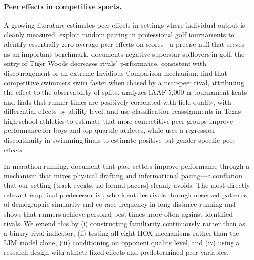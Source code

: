\documentclass[12pt]{article}
\theoremstyle{definition}
\theoremstyle{remark}
\begin{document}
\paragraph{Peer effects in competitive sports.}
A growing literature estimates peer effects in settings where individual output
is cleanly measured.
\citet{GuryanKroftNotowidigdo2009} exploit random pairing in professional golf
tournaments to identify essentially zero average peer effects on scores---a
precise null that serves as an important benchmark.
\citet{Brown2011} documents negative superstar spillovers in golf: the entry of
Tiger Woods decreases rivals' performance, consistent with discouragement or an
extreme Invidious Comparison mechanism.
\citet{YamaneHayashi2015} find that competitive swimmers swim faster when chased
by a near-peer rival, attributing the effect to the observability of splits.
\citet{Hill2014} analyzes IAAF 5{,}000 m tournament heats and finds that runner
times are positively correlated with field quality, with differential effects
by ability level.
\citet{Ashby2025} and \citet{AshbyRamos2023} use classification reassignments
in Texas high-school athletics to estimate that more competitive peer groups
improve performance for boys and top-quartile athletes, while \citet{Jiang2020}
uses a regression discontinuity in swimming finals to estimate positive but
gender-specific peer effects.

In marathon running, \citet{EmersonHill2018} document that pace setters
improve performance through a mechanism that mixes physical drafting and
informational pacing---a conflation that our setting (track events, no formal
pacers) cleanly avoids.
The most directly relevant empirical predecessor is \citet{Kilduff2014},
who identifies rivals through observed patterns of demographic similarity and
co-race frequency in long-distance running and shows that runners achieve
personal-best times more often against identified rivals.
We extend this by (i) constructing familiarity continuously rather than as a
binary rival indicator, (ii) testing all eight HOX mechanisms rather than
the LIM model alone, (iii) conditioning on opponent quality level, and
(iv) using a research design with athlete fixed effects and predetermined
peer variables.
\end{document}

